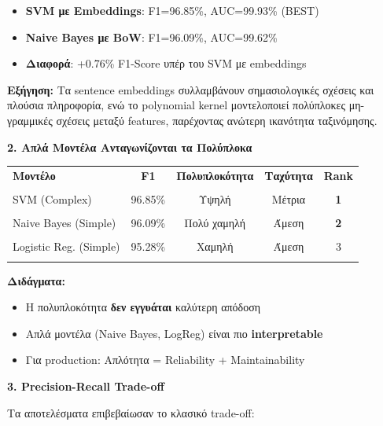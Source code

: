 \documentclass[12pt,a4paper,twoside]{book}
\begin{document}
\begin{itemize}
    \item \textbf{SVM με Embeddings}: F1=96.85\%, AUC=99.93\% (BEST)
    \item \textbf{Naive Bayes με BoW}: F1=96.09\%, AUC=99.62\%
    \item \textbf{Διαφορά}: +0.76\% F1-Score υπέρ του SVM με embeddings
\end{itemize}

\textbf{Εξήγηση:} Τα sentence embeddings συλλαμβάνουν σημασιολογικές σχέσεις και πλούσια πληροφορία, ενώ το polynomial kernel μοντελοποιεί πολύπλοκες μη-γραμμικές σχέσεις μεταξύ features, παρέχοντας ανώτερη ικανότητα ταξινόμησης.

\textbf{2. Απλά Μοντέλα Ανταγωνίζονται τα Πολύπλοκα}

\begin{table}[H]
    \centering
    \begin{tabular}{lcccc}
        \hline
        \textbf{Μοντέλο}       & \textbf{F1} & \textbf{Πολυπλοκότητα} & \textbf{Ταχύτητα} & \textbf{Rank} \\\\
        \hline
        SVM (Complex)          & 96.85\%     & Υψηλή                  & Μέτρια            & \textbf{1}    \\\\
        Naive Bayes (Simple)   & 96.09\%     & Πολύ χαμηλή            & Άμεση             & \textbf{2}    \\\\
        Logistic Reg. (Simple) & 95.28\%     & Χαμηλή                 & Άμεση             & 3             \\\\
        \hline
    \end{tabular}
\end{table}

\textbf{Διδάγματα:}
\begin{itemize}
    \item Η πολυπλοκότητα \textbf{δεν εγγυάται} καλύτερη απόδοση
    \item Απλά μοντέλα (Naive Bayes, LogReg) είναι πιο \textbf{interpretable}
    \item Για production: Απλότητα = Reliability + Maintainability
\end{itemize}

\textbf{3. Precision-Recall Trade-off}

Τα αποτελέσματα επιβεβαίωσαν το κλασικό trade-off:
\end{document}
